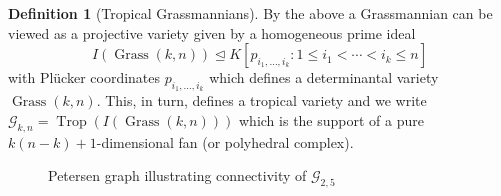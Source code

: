 \documentclass[
  paper=a4,
  titlepage,
  bibliography=totoc,
  listof=totoc,
  pagesize=pdftex
]{scrartcl}
\numberwithin{figure}{section}
\numberwithin{equation}{section}
\numberwithin{table}{section}
\let\idealof\trianglelefteq
\DeclareMathOperator{\Trop}{Trop}
\DeclareMathOperator{\Grass}{Grass}
\theoremstyle{definition}
\newtheorem{definition}{Definition}
\numberwithin{definition}{section}
\begin{document}
\begin{definition}[Tropical Grassmannians]
  By the above a Grassmannian can be viewed as a projective variety given by a homogeneous
  prime ideal
  \[
    I(\Grass(k,n)) \idealof K[ p_{i_1, \dots, i_k} : 1\leq i_1 < \cdots < i_k \leq n ]
  \]
  with Plücker coordinates $p_{i_1,\dots,i_k}$ which defines a determinantal variety
  $\Grass(k, n)$. This, in turn, defines a tropical variety and we write $\mathcal G_{k,n}
  = \Trop(I(\Grass(k,n)))$ which is the support of a pure $k(n-k)+1$-dimensional fan (or
  polyhedral complex).
\end{definition}

\begin{figure}[tbhp]
  \centering
  \caption{Petersen graph illustrating connectivity of $\mathcal G_{2,5}$}
  \label{fig:petersen}
\end{figure}
\end{document}
